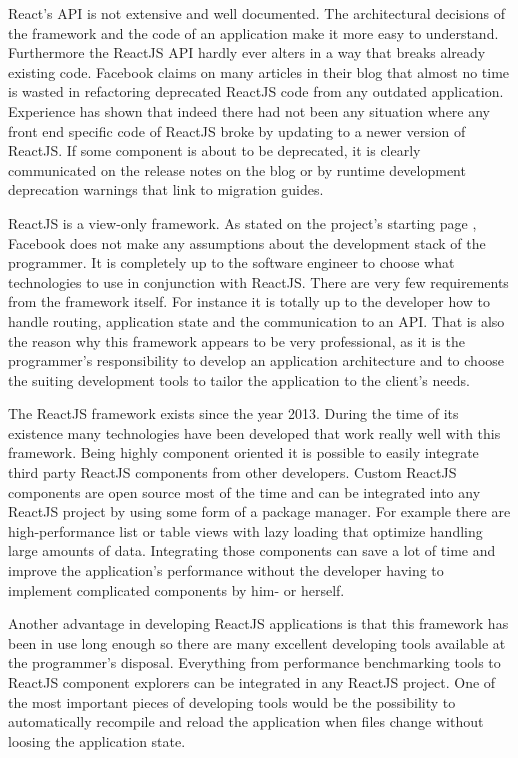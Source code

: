 React's API is not extensive and well documented. The architectural decisions of the framework and the code of an application make it more easy to understand. Furthermore the ReactJS API hardly ever alters in a way that breaks already existing code. Facebook claims on many articles in their blog \cite[Blog]{FacebookInc.2013} that almost no time is wasted in refactoring deprecated ReactJS code from any outdated application. Experience has shown that indeed there had not been any situation where any front end specific code of ReactJS broke by updating to a newer version of ReactJS. If some component is about to be deprecated, it is clearly communicated on the release notes on the blog or by runtime development deprecation warnings that link to migration guides. 

ReactJS is a view-only framework. As stated on the project's starting page \cite{FacebookInc.2013}, Facebook does not make any assumptions about the development stack of the programmer. It is completely up to the software engineer to choose what technologies to use in conjunction with ReactJS. There are very few requirements from the framework itself. For instance it is totally up to the developer how to handle routing, application state and the communication to an API. That is also the reason why this framework appears to be very professional, as it is the programmer's responsibility to develop an application architecture and to choose the suiting development tools to tailor the application to the client's needs.

The ReactJS framework exists since the year 2013. During the time of its existence many technologies have been developed that work really well with this framework. Being highly component oriented it is possible to easily integrate third party ReactJS components from other developers. Custom ReactJS components are open source most of the time and can be integrated into any ReactJS project by using some form of a package manager. For example there are high-performance list or table views with lazy loading that optimize handling large amounts of data. Integrating those components can save a lot of time and improve the application's performance without the developer having to implement complicated components by him- or herself. 

Another advantage in developing ReactJS applications is that this framework has been in use long enough so there are many excellent developing tools available at the programmer's disposal. Everything from performance benchmarking tools to ReactJS component explorers can be integrated in any \mbox{ReactJS} project. One of the most important pieces of developing tools would be the possibility to automatically recompile and reload the application when files change without loosing the application state.

